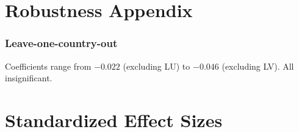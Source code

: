 \documentclass[12pt]{article}
\begin{document}
\section{Robustness Appendix}
\subsubsection*{Leave-one-country-out} Coefficients range from $-0.022$ (excluding LU) to $-0.046$ (excluding LV). All insignificant.

\section{Standardized Effect Sizes}
\label{sec:sde}


\end{document}
